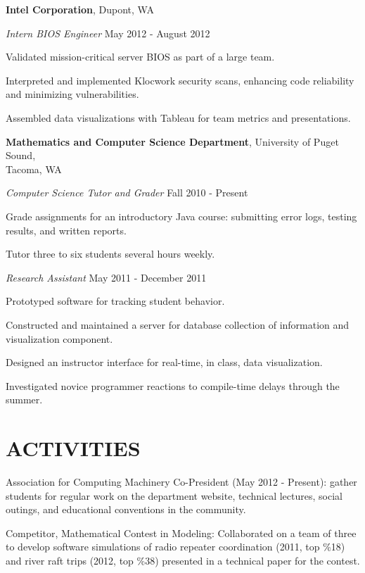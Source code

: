 \documentclass[line,margin]{res}
\newenvironment{itemize*}%
  {\begin{itemize}%
    \setlength{\parsep}{0pt}
    \setlength{\itemsep}{0pt}%
    \setlength{\parskip}{0pt}}%
  {\end{itemize}}
\begin{document}
\begin{resume}
\textbf{Intel Corporation}, Dupont, WA

{\sl Intern BIOS Engineer} \hfill May 2012 - August 2012
\begin{itemize*}
    \item Validated mission-critical server BIOS as part of a large team.
    \item Interpreted and implemented Klocwork security scans, enhancing 
        code reliability and minimizing vulnerabilities.
    \item Assembled data visualizations with Tableau for team metrics and 
        presentations.
\end{itemize*}            

\textbf{Mathematics and Computer Science Department},
University of Puget Sound,\\
Tacoma, WA

{\sl Computer Science Tutor and Grader} \hfill Fall 2010 - Present
\begin{itemize*}  
    \item Grade assignments for an introductory Java course: submitting 
      error logs, testing results, and written reports.
    \item Tutor three to six students several hours weekly.
\end{itemize*}

{\sl Research Assistant} \hfill May 2011 - December 2011
\begin{itemize*}
    \item Prototyped software for tracking student behavior.
    \item Constructed and maintained a server for database collection of 
      information and visualization component.
    \item Designed an instructor interface for real-time, in class, data 
      visualization.
    \item Investigated novice programmer reactions to compile-time delays 
        through the summer.
\end{itemize*}            

\vspace*{.2cm}

\section{ACTIVITIES}

\begin{itemize*}
\item Association for Computing Machinery Co-President (May 2012 - Present): gather
    students for regular work on the department website, technical lectures,
    social outings, and educational conventions in the community.
\item Competitor, Mathematical Contest in Modeling: Collaborated on a team of three to 
    develop software simulations of radio repeater coordination (2011, top \%18) and river 
    raft trips (2012, top \%38) presented in a technical paper for the contest.\\
\end{itemize*}


\end{resume}
\end{document}
